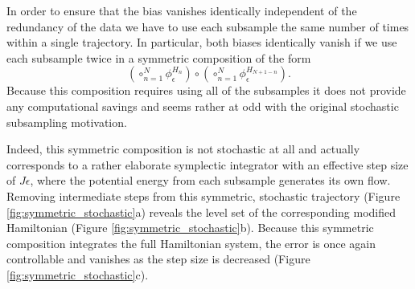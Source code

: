 \documentclass{article}
\begin{document}
In order to ensure that the bias vanishes identically independent of the redundancy
of the data we have to use each subsample the same number of times within a single 
trajectory.  In particular, both biases identically vanish if we use each subsample twice 
in a symmetric composition of the form
%
\begin{equation*}
\left( \circ_{n = 1}^{N} \phi^{H_{n}}_{\epsilon} \right)
\circ 
\left( \circ_{n = 1}^{N} \phi^{H_{N + 1 - n}}_{\epsilon} \right).
\end{equation*}
%
Because this composition requires using all of the subsamples it does not provide
any computational savings and seems rather at odd with the original stochastic 
subsampling motivation. 

Indeed, this symmetric composition is not stochastic at all and actually corresponds 
to a rather elaborate symplectic integrator with an effective step size of $J \epsilon$, 
where the potential energy from each subsample generates its own flow.  Removing 
intermediate steps from this symmetric, stochastic trajectory 
(Figure \ref{fig:symmetric_stochastic}a) reveals the level set of the corresponding
modified Hamiltonian (Figure \ref{fig:symmetric_stochastic}b).  Because this
symmetric composition integrates the full Hamiltonian system, the error is 
once again controllable and vanishes as the step size is decreased
(Figure \ref{fig:symmetric_stochastic}c).
\end{document}
